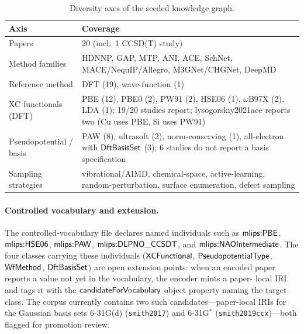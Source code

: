 \begin{table}[t]
\centering
\caption{Diversity axes of the seeded knowledge graph.}
\label{tab:kg-diversity}
\begin{tabular}{l@{\hspace{8pt}}p{}}
\toprule
\textbf{Axis} & \textbf{Coverage} \\
\midrule
Papers & 20 (incl.\ 1 CCSD(T) study) \\
Method families & HDNNP, GAP, MTP, ANI, ACE, SchNet, MACE/NequIP/Allegro, M3GNet/CHGNet, DeepMD \\
Reference method & DFT (19), wave-function (1) \\
XC functionals (DFT) & PBE (12), PBE0 (2), PW91 (2), HSE06 (1), $\omega$B97X (2), LDA (1); 19/20 studies report; lysogorskiy2021ace reports two (Cu uses PBE, Si uses PW91) \\
Pseudopotential / basis & PAW (8), ultrasoft (2), norm-conserving (1), all-electron with $\mathsf{DftBasisSet}$ (3); 6 studies do not report a basis specification \\
Sampling strategies & vibrational/AIMD, chemical-space, active-learning, random-perturbation, surface enumeration, defect sampling \\
\bottomrule
\end{tabular}
\end{table}

\paragraph{Controlled vocabulary and extension.}
The controlled-vocabulary file declares named individuals such as
$\mathsf{mlips{:}PBE}$, $\mathsf{mlips{:}HSE06}$,
$\mathsf{mlips{:}PAW}$, $\mathsf{mlips{:}DLPNO\_CCSDT}$, and
$\mathsf{mlips{:}NAOIntermediate}$. The four classes carrying these
individuals ($\mathsf{XCFunctional}$, $\mathsf{PseudopotentialType}$, $\mathsf{WfMethod}$,
$\mathsf{DftBasisSet}$) are open extension points: when an encoded paper
reports a value not yet in the vocabulary, the encoder mints a paper-
local IRI and tags it with the
$\mathsf{candidateForVocabulary}$ object property naming the target class.
The corpus currently contains two such candidates---paper-local IRIs
for the Gaussian basis sets 6-31G(d) (\texttt{smith2017}) and 6-31G$^*$
(\texttt{smith2019ccx})---both flagged for promotion review.

